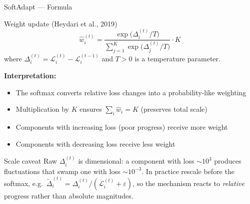 \documentclass[aspectratio=169,11pt]{beamer}
\newcommand{\emphc}[1]{\textcolor{harvardcrimson}{#1}}
\begin{document}
\begin{frame}[shrink=15]{SoftAdapt --- Formula}
\begin{block}{Weight update (Heydari et al., 2019)}
\[
    \hat{w}_i^{(t)} = \frac{\exp\!\bigl(\Delta_i^{(t)} / T\bigr)}{\sum_{j=1}^K \exp\!\bigl(\Delta_j^{(t)} / T\bigr)} \cdot K
\]
where $\Delta_i^{(t)} = \mathcal{L}_i^{(t)} - \mathcal{L}_i^{(t-1)}$ and $T > 0$ is a temperature parameter.
\end{block}

\vspace{0.3cm}
\textbf{Interpretation:}
\begin{itemize}
    \item The softmax converts relative loss changes into a probability-like weighting
    \item Multiplication by $K$ ensures $\sum_i \hat{w}_i = K$ (preserves total scale)
    \item Components with \emphc{increasing loss} (poor progress) receive more weight
    \item Components with decreasing loss receive less weight
\end{itemize}

\vspace{0.2cm}
\begin{alertblock}{Scale caveat}
\footnotesize
Raw $\Delta_i^{(t)}$ is dimensional: a component with loss $\sim 10^3$ produces fluctuations that swamp one with loss $\sim 10^{-3}$. In practice rescale before the softmax, e.g.\ $\tilde\Delta_i^{(t)} = \Delta_i^{(t)} / (\mathcal{L}_i^{(t)} + \varepsilon)$, so the mechanism reacts to \emph{relative} progress rather than absolute magnitudes.
\end{alertblock}
\end{frame}
\end{document}
